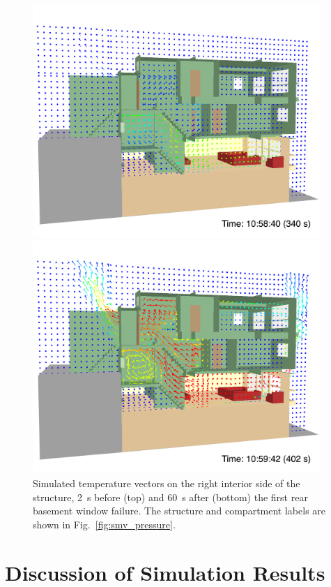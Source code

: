 \documentclass[12pt,oneside]{book}
\begin{document}
\begin{figure}[!ht]
\includegraphics[width=4.3in]{../Figures/SMV_Temp_Vec_340_s}


\includegraphics[width=4.3in]{../Figures/SMV_Temp_Vec_402_s}


\caption[Simulated temperature vectors on the right interior side of the structure.]
{Simulated temperature vectors on the right interior side of the structure, 2~s before (top) and 60~s after (bottom) the first rear basement window failure. The structure and compartment labels are shown in Fig.~\ref{fig:smv_pressure}.}
\label{fig:smv_temperature_vectors}
\end{figure}


\chapter{Discussion of Simulation Results}
\label{sec:discussion}
\end{document}
